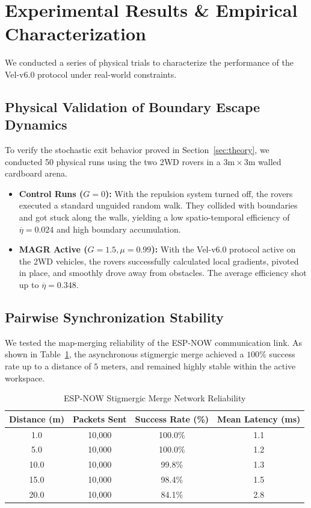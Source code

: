 \documentclass[journal,twoside]{IEEEtran}
\begin{document}
\section{Experimental Results \& Empirical Characterization}
\label{sec:results}

We conducted a series of physical trials to characterize the performance of the Vel-v6.0 protocol under real-world constraints.

\subsection{Physical Validation of Boundary Escape Dynamics}
To verify the stochastic exit behavior proved in Section~\ref{sec:theory}, we conducted 50 physical runs using the two 2WD rovers in a $3\text{m} \times 3\text{m}$ walled cardboard arena.

\begin{itemize}
    \item \textbf{Control Runs ($G = 0$):} With the repulsion system turned off, the rovers executed a standard unguided random walk. They collided with boundaries and got stuck along the walls, yielding a low spatio-temporal efficiency of $\overline{\eta} = 0.024$ and high boundary accumulation.
    \item \textbf{MAGR Active ($G = 1.5, \mu = 0.99$):} With the Vel-v6.0 protocol active on the 2WD vehicles, the rovers successfully calculated local gradients, pivoted in place, and smoothly drove away from obstacles. The average efficiency shot up to $\overline{\eta} = 0.348$.
\end{itemize}

\subsection{Pairwise Synchronization Stability}
We tested the map-merging reliability of the ESP-NOW communication link. As shown in Table~\ref{tab:sync_metrics}, the asynchronous stigmergic merge achieved a $100\%$ success rate up to a distance of $5\text{ meters}$, and remained highly stable within the active workspace.

\begin{table}[htbp]
\centering
\caption{ESP-NOW Stigmergic Merge Network Reliability}
\label{tab:sync_metrics}
\begin{tabular}{cccc}
\toprule
Distance (m) & Packets Sent & Success Rate (\%) & Mean Latency (ms) \\
\midrule
1.0  & 10,000 & 100.0\% & 1.1 \\
5.0  & 10,000 & 100.0\% & 1.2 \\
10.0 & 10,000 & 99.8\%  & 1.3 \\
15.0 & 10,000 & 98.4\%  & 1.5 \\
20.0 & 10,000 & 84.1\%  & 2.8 \\
\bottomrule
\end{tabular}
\end{table}
\end{document}
